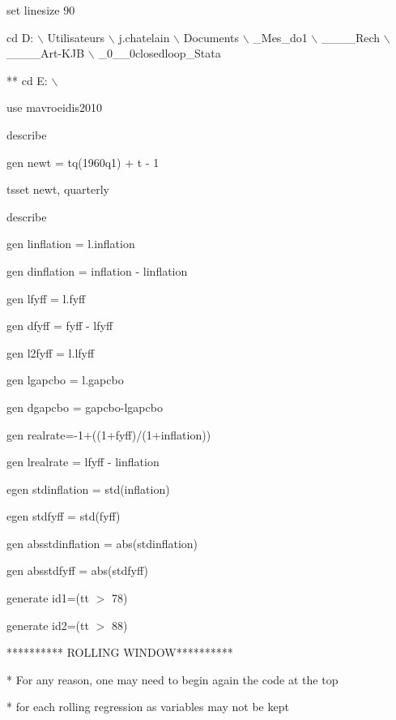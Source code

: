 \documentclass[12pt,a4paper]{article}%
\begin{document}
set linesize 90

cd D:%
$\backslash$%
Utilisateurs%
$\backslash$%
j.chatelain%
$\backslash$%
Documents%
$\backslash$%
\_Mes\_do1%
$\backslash$%
\_\_\_\_Rech%
$\backslash$%
\_\_\_\_Art-KJB%
$\backslash$%
\_0\_\_0closedloop\_Stata

** cd E:%
$\backslash$%


use mavroeidis2010

describe

gen newt = tq(1960q1) + t - 1

tsset newt, quarterly

describe

gen linflation = l.inflation

gen dinflation = inflation - linflation

gen lfyff = l.fyff

gen dfyff = fyff - lfyff

gen l2fyff = l.lfyff

gen lgapcbo = l.gapcbo

gen dgapcbo = gapcbo-lgapcbo

gen realrate=-1+((1+fyff)/(1+inflation))

gen lrealrate = lfyff - linflation

egen stdinflation = std(inflation)

egen stdfyff = std(fyff)

gen absstdinflation = abs(stdinflation)

gen absstdfyff = abs(stdfyff)

generate id1=(tt%
$>$%
78)

generate id2=(tt%
$>$%
88)

********** ROLLING WINDOW**********

* For any reason, one may need to begin again the code at the top

* for each rolling regression as variables may not be kept
\end{document}
